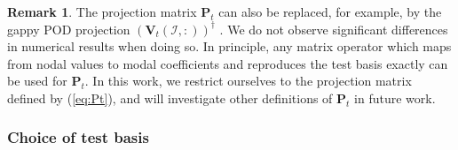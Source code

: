\documentclass[preprint,10pt]{elsarticle}
\theoremstyle{definition}
\theoremstyle{lemma}
\newtheorem*{remark}{Remark}
\theoremstyle{theorem}
\theoremstyle{assumption}
\newcommand{\LRp}[1]{\left( #1 \right)}
\begin{document}
\begin{remark}
The projection matrix $\bm{P}_t$ can also be replaced, for example, by the gappy POD projection $\LRp{\bm{V}_t\LRp{\mathcal{I},:}}^{\dagger}$ \cite{willcox2006unsteady,astrid2008missing}.  We do not observe significant differences in numerical results when doing so.  In principle, any matrix operator which maps from nodal values to modal coefficients and reproduces the test basis exactly can be used for $\bm{P}_t$.  In this work, we restrict ourselves to the projection matrix defined by (\ref{eq:Pt}), and will investigate other definitions of $\bm{P}_t$ in future work.
\end{remark}

\subsubsection{Choice of test basis}
\end{document}

